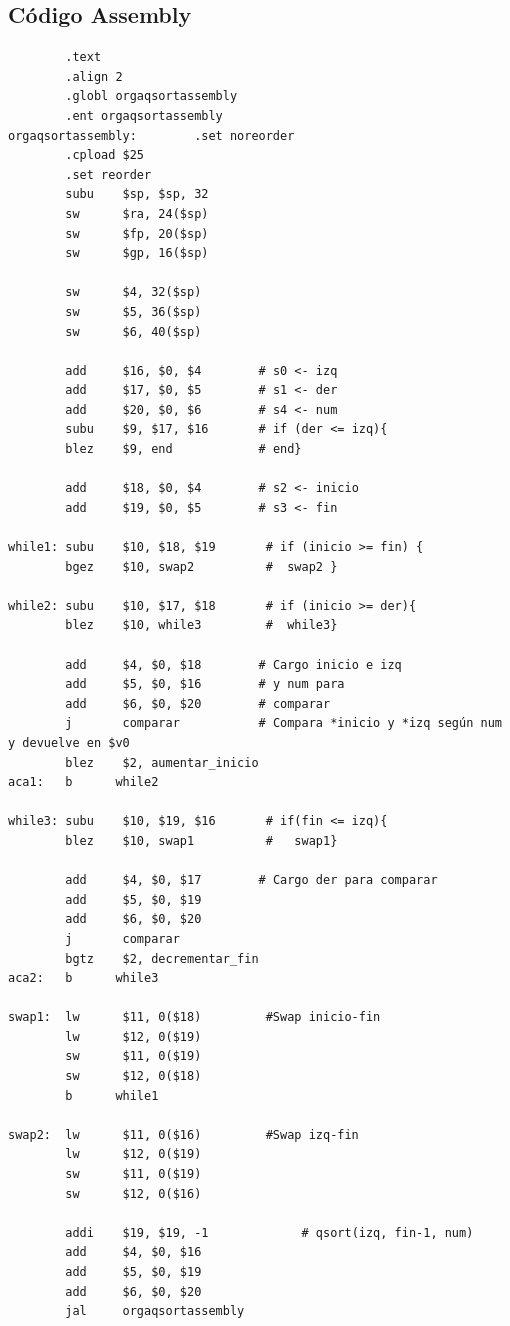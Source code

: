 \documentclass[a4paper, 12pt]{article}
\begin{document}
	\subsection{Código Assembly}
	
	\begin{verbatim}
        .text
        .align 2
        .globl orgaqsortassembly
        .ent orgaqsortassembly
orgaqsortassembly:        .set noreorder
        .cpload $25
        .set reorder
        subu    $sp, $sp, 32
        sw      $ra, 24($sp)
        sw      $fp, 20($sp)
        sw      $gp, 16($sp)

        sw      $4, 32($sp)
        sw      $5, 36($sp)
        sw      $6, 40($sp)

        add     $16, $0, $4        # s0 <- izq
        add     $17, $0, $5        # s1 <- der
        add     $20, $0, $6        # s4 <- num
        subu    $9, $17, $16       # if (der <= izq){
        blez    $9, end            # end}

        add     $18, $0, $4        # s2 <- inicio
        add     $19, $0, $5        # s3 <- fin

while1: subu    $10, $18, $19       # if (inicio >= fin) {
        bgez    $10, swap2          #  swap2 }

while2: subu    $10, $17, $18       # if (inicio >= der){
        blez    $10, while3         #  while3}

        add     $4, $0, $18        # Cargo inicio e izq
        add     $5, $0, $16        # y num para
        add     $6, $0, $20        # comparar
        j       comparar           # Compara *inicio y *izq según num y devuelve en $v0
        blez    $2, aumentar_inicio
aca1:   b      while2

while3: subu    $10, $19, $16       # if(fin <= izq){
        blez    $10, swap1          #   swap1}

        add     $4, $0, $17        # Cargo der para comparar
        add		$5, $0, $19
        add		$6, $0, $20
        j       comparar
        bgtz    $2, decrementar_fin
aca2:   b      while3

swap1:  lw      $11, 0($18)         #Swap inicio-fin
        lw      $12, 0($19)
        sw      $11, 0($19)
        sw      $12, 0($18)
        b      while1

swap2:  lw      $11, 0($16)         #Swap izq-fin
        lw      $12, 0($19)
        sw      $11, 0($19)
        sw      $12, 0($16)

        addi    $19, $19, -1             # qsort(izq, fin-1, num)
        add     $4, $0, $16
        add     $5, $0, $19
        add     $6, $0, $20
        jal     orgaqsortassembly


\end{verbatim}
\end{document}
